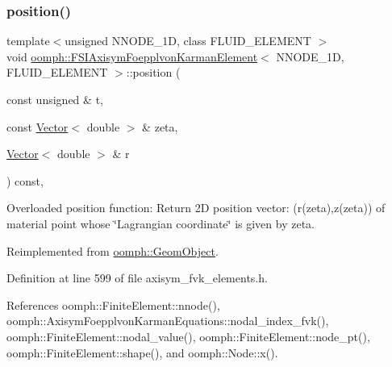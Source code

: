 \subsubsection{\texorpdfstring{position()}{position()}\hspace{0.1cm}{\footnotesize\ttfamily [2/2]}}
{\footnotesize\ttfamily template$<$unsigned N\+N\+O\+D\+E\+\_\+1D, class F\+L\+U\+I\+D\+\_\+\+E\+L\+E\+M\+E\+NT $>$ \\
void \hyperlink{classoomph_1_1FSIAxisymFoepplvonKarmanElement}{oomph\+::\+F\+S\+I\+Axisym\+Foepplvon\+Karman\+Element}$<$ N\+N\+O\+D\+E\+\_\+1D, F\+L\+U\+I\+D\+\_\+\+E\+L\+E\+M\+E\+NT $>$\+::position (\begin{DoxyParamCaption}\item[{const unsigned \&}]{t,  }\item[{const \hyperlink{classoomph_1_1Vector}{Vector}$<$ double $>$ \&}]{zeta,  }\item[{\hyperlink{classoomph_1_1Vector}{Vector}$<$ double $>$ \&}]{r }\end{DoxyParamCaption}) const\hspace{0.3cm}{\ttfamily [inline]}, {\ttfamily [virtual]}}



Overloaded position function\+: Return 2D position vector\+: (r(zeta),z(zeta)) of material point whose \char`\"{}\+Lagrangian coordinate\char`\"{} is given by zeta. 



Reimplemented from \hyperlink{classoomph_1_1GeomObject_ad44a736d23dcd63af163a7d80b5c4dfa}{oomph\+::\+Geom\+Object}.



Definition at line 599 of file axisym\+\_\+fvk\+\_\+elements.\+h.



References oomph\+::\+Finite\+Element\+::nnode(), oomph\+::\+Axisym\+Foepplvon\+Karman\+Equations\+::nodal\+\_\+index\+\_\+fvk(), oomph\+::\+Finite\+Element\+::nodal\+\_\+value(), oomph\+::\+Finite\+Element\+::node\+\_\+pt(), oomph\+::\+Finite\+Element\+::shape(), and oomph\+::\+Node\+::x().

\mbox{\label{classoomph_1_1FSIAxisymFoepplvonKarmanElement_aa7ac9f6e82b6890030a739665ec1f63a}} 
